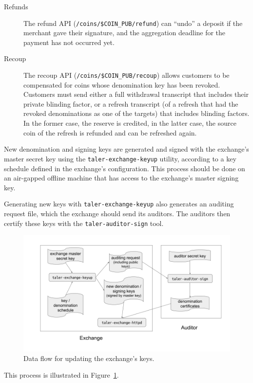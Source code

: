 \begin{description}
  \item[Refunds] The refund API (\texttt{/coins/\$COIN\_PUB/refund}) can ``undo'' a deposit if the merchant gave their signature, and the aggregation deadline
    for the payment has not occurred yet.
  \item[Recoup]  The recoup API (\texttt{/coins/\$COIN\_PUB/recoup}) allows customers to be compensated
    for coins whose denomination key has been revoked.  Customers must send either a full withdrawal transcript that
    includes their private blinding factor, or a refresh transcript (of a refresh that had the revoked denominations as one of the targets)
    that includes blinding factors.  In the former case, the reserve is credited, in the latter case, the source coin of the
    refresh is refunded and can be refreshed again.
\end{description}

New denomination and signing keys are generated and signed with the exchange's master
secret key using the \texttt{taler-exchange-keyup} utility, according to a key schedule
defined in the exchange's configuration.  This process should be done on an air-gapped
offline machine that has access to the exchange's master signing key.

Generating new keys with \texttt{taler-exchange-keyup} also generates an
auditing request file, which the exchange should send its auditors.  The auditors then
certify these keys with the \texttt{taler-auditor-sign} tool.

\begin{figure}
    \includegraphics[width=\textwidth]{diagrams/taler-diagram-keyup.png}
    \caption{Data flow for updating the exchange's keys.}
    \label{figure:keyup}
\end{figure}

This process is illustrated in Figure~\ref{figure:keyup}.

